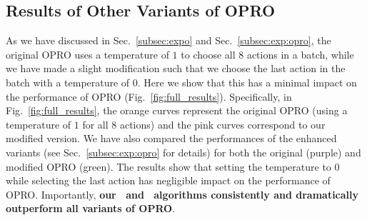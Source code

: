 \subsection{Results of Other Variants of OPRO}
\label{exp:app:opro:full:results}
As we have discussed in Sec.~\ref{subsec:expo} and Sec.~\ref{subsec:exp:opro}, the original OPRO uses a temperature of $1$ to choose all $8$ actions in a batch, while we have made a slight modification such that we choose the last action in the batch with a temperature of $0$. Here we show that this has a minimal impact on the performance of OPRO (Fig.~\ref{fig:full_results}).
Specifically, in Fig.~\ref{fig:full_results}, the orange curves represent the original OPRO (using a temperature of $1$ for all $8$ actions) and the pink curves correspond to our modified version.
We have also compared the performances of the enhanced variants (see Sec.~\ref{subsec:exp:opro} for details) for both the original (purple) and modified OPRO (green).
The results show that setting the temperature to $0$ while selecting the last action has negligible impact on the performance of OPRO.
Importantly, \textbf{our \alg~and \alges~algorithms consistently and dramatically outperform all variants of OPRO}.
